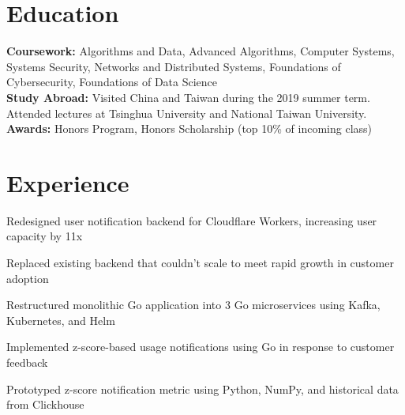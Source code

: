 \documentclass[]{deedy-resume}
\begin{document}

\vspace{2pt}

\sectionsep


\section{Education} 
\vspace{3pt}
\textbf{Coursework:} Algorithms and Data, Advanced Algorithms, Computer Systems, Systems Security, Networks and Distributed Systems, Foundations of Cybersecurity, Foundations of Data Science \\
\textbf{Study Abroad:} Visited China and Taiwan during the 2019 summer term. Attended lectures at Tsinghua University and National Taiwan University. \\
\textbf{Awards:} Honors Program, Honors Scholarship (top 10\% of incoming class)
\sectionsep


\section{Experience}
\begin{tightemize}
\item Redesigned user notification backend for Cloudflare Workers, increasing user capacity by 11x
\item Replaced existing backend that couldn't scale to meet rapid growth in customer adoption
\item Restructured monolithic Go application into 3 Go microservices using Kafka, Kubernetes, and Helm
\item Implemented z-score-based usage notifications using Go in response to customer feedback
\item Prototyped z-score notification metric using Python, NumPy, and historical data from Clickhouse
\end{tightemize}
\sectionsep
\end{document}
